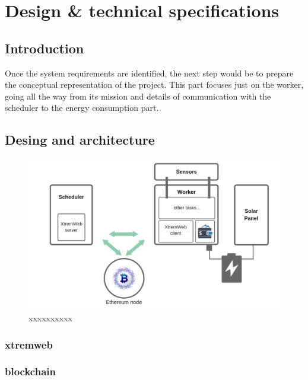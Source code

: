 

\chapter{Design \& technical specifications}


\section{Introduction}
    Once the system requirements are identified, the next step would be to prepare the conceptual representation
    of the project. This part focuses just on the worker, going all the way from its mission and details of
    communication with the scheduler to the energy consumption part.

\section{Desing and architecture}

    \begin{figure}[!h]\centering
        \includegraphics[width=.9\columnwidth]{5-Design/figs/worker-diagram.png}
        \caption{xxxxxxxxxx}
    \end{figure}

    \subsection{xtremweb}
    \subsection{blockchain}
